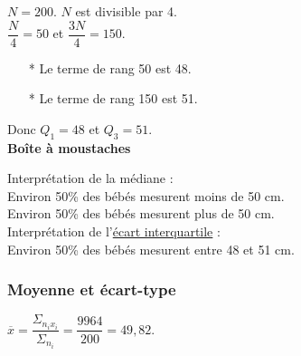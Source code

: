 $ N = 200 $. $N$ est divisible par 4. \\

$\dfrac{N}{4} = 50 $ et $\dfrac{3N}{4} = 150 $. \\

\begin{itemize}
\item[*] Le terme de rang 50 est 48.
\item[*] Le terme de rang 150 est 51.
\end{itemize}

\vspace*{.3cm}

Donc $Q_1 = 48$ et $Q_3 = 51$. \\

\textbf{Boîte à moustaches}

\bigskip 



Interprétation de la médiane : \\

Environ 50\% des bébés mesurent moins de 50 cm. \\
Environ 50\% des bébés mesurent plus de 50 cm. \\

Interprétation de l'\underline{écart interquartile} : \\

Environ 50\% des bébés mesurent entre 48 et 51 cm. 

\newpage

\subsubsection{Moyenne et écart-type}

$\overline{x} = \dfrac{\Sigma_{n_ix_i}}{\Sigma_{n_i}} = \dfrac{9964}{200} = 49,82$. \\

